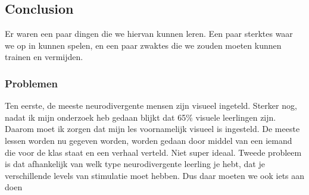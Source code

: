 \documentclass{article}
\begin{document}
        \subsection{Conclusion}
            Er waren een paar dingen die we hiervan kunnen leren. Een paar sterktes waar we op in kunnen spelen, en een paar zwaktes die we zouden moeten kunnen trainen en vermijden.
        
        \subsubsection{Problemen}
            Ten eerste, de meeste neurodivergente mensen zijn visueel ingeteld. Sterker nog, nadat ik mijn onderzoek heb gedaan blijkt dat 65\% visuele leerlingen zijn.\cite{Visual-Learners-are-the-most-common} Daarom moet ik zorgen dat mijn les voornamelijk visueel is ingesteld. De meeste lessen worden nu gegeven worden, worden gedaan door middel van een iemand die voor de klas staat en een verhaal verteld. Niet super ideaal. Tweede probleem is dat afhankelijk van welk type neurodivergente leerling je hebt, dat je verschillende levels van stimulatie moet hebben. Dus daar moeten we ook iets aan doen
        
\end{document}
